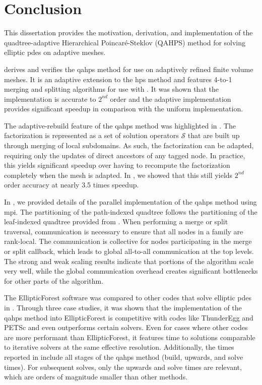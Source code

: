 \section{Conclusion}
\label{sec:conclusion}

This dissertation provides the motivation, derivation, and implementation of the quadtree-adaptive Hierarchical Poincar\'e-Steklov (QAHPS) method for solving elliptic \gls{pdes} on adaptive meshes.

 derives and verifies the \gls{qahps} method for use on adaptively refined finite volume meshes. It is an adaptive extension to the \gls{hps} method \citep{gillman2014direct} and features 4-to-1 merging and splitting algorithms for use with \pforest \citep{burstedde2011p4est}. It was shown that the implementation is accurate to $2^{nd}$ order and the adaptive implementation provides significant speedup in comparison with the uniform implementation.

The adaptive-rebuild feature of the \gls{qahps} method was highlighted in . The factorization is represented as a set of solution operators $\mathcal{S}$ that are built up through merging of local subdomains. As such, the factorization can be adapted, requiring only the updates of direct ancestors of any tagged node. In practice, this yields significant speedup over having to recompute the factorization completely when the mesh is adapted. In , we showed that this still yields $2^{nd}$ order accuracy at nearly 3.5 times speedup.

In , we provided details of the parallel implementation of the \gls{qahps} method using \gls{mpi}. The partitioning of the path-indexed quadtree follows the partitioning of the leaf-indexed quadtree provided from \pforest. When performing a merge or split traversal, communication is necessary to ensure that all nodes in a family are rank-local. The communication is collective for nodes participating in the merge or split callback, which leads to global all-to-all communication at the top levels. The strong and weak scaling results indicate that portions of the algorithm scale very well, while the global communication overhead creates significant bottlenecks for other parts of the algorithm.

The EllipticForest software was compared to other codes that solve elliptic \gls{pdes} in . Through three case studies, it was shown that the implementation of the \gls{qahps} method into EllipticForest is competitive with codes like ThunderEgg and PETSc and even outperforms certain solvers. Even for cases where other codes are more performant than EllipticForest, it features time to solutions comparable to iterative solvers at the same effective resolution. Additionally, the times reported in  include all stages of the \gls{qahps} method (build, upwards, and solve times). For subsequent solves, only the upwards and solve times are relevant, which are orders of magnitude smaller than other methods.